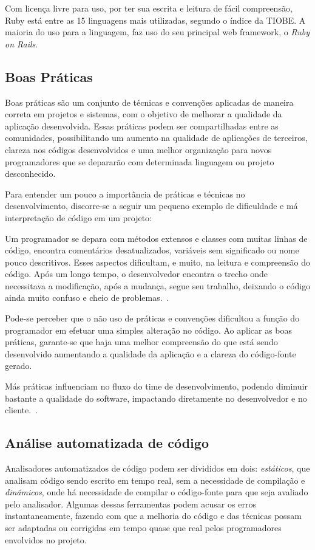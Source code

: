 \documentclass[11pt,a4paper,usenames,dvipsnames]{article}
\begin{document}
Com licença livre para uso, por ter sua escrita e leitura de fácil compreensão, Ruby está entre as 15 linguagens mais utilizadas, segundo o índice da TIOBE\cite{TIOBE}. A maioria do uso para a linguagem, faz uso do seu principal web framework, o \textit{Ruby on Rails}\cite{RoR}.

\subsection{Boas Práticas}


Boas práticas são um conjunto de técnicas e convenções aplicadas de maneira correta em projetos e sistemas, com o objetivo de melhorar a qualidade da aplicação desenvolvida. Essas práticas podem ser compartilhadas entre as comunidades, possibilitando um aumento na qualidade de aplicações de terceiros, clareza nos códigos desenvolvidos e uma melhor organização para novos programadores que se depararão com determinada linguagem ou projeto desconhecido.

Para entender um pouco a importância de práticas e técnicas no desenvolvimento, discorre-se a seguir um pequeno exemplo de dificuldade e má interpretação de código em um projeto:

Um programador se depara com métodos extensos e classes com muitas linhas de código, encontra comentários desatualizados, variáveis sem significado ou nome pouco descritivos. Esses aspectos dificultam, e muito, na leitura e compreensão do código. Após um longo tempo, o desenvolvedor encontra o trecho onde necessitava a modificação, após  a mudança, segue seu trabalho, deixando o código ainda muito confuso e cheio de problemas.~\cite{almeida2010codigo}.

Pode-se perceber que o não uso de práticas e convenções dificultou a função do programador em efetuar uma simples alteração no código. Ao aplicar as boas práticas, garante-se que haja uma melhor compreensão do que está sendo desenvolvido aumentando a qualidade da aplicação e a clareza do código-fonte gerado.

Más práticas influenciam no fluxo do time de desenvolvimento, podendo diminuir bastante a qualidade do software, impactando diretamente no desenvolvedor e no cliente.~\cite{assisimpacto}.

\subsection{Análise automatizada de código}

Analisadores automatizados de código podem ser divididos em dois: \textit{estáticos}, que analisam  código sendo escrito em tempo real, sem a necessidade de compilação e \textit{dinâmicos}, onde há necessidade de compilar o código-fonte para que seja avaliado pelo analisador. Algumas dessas ferramentas podem acusar os erros instantaneamente, fazendo com que a melhoria do código e das técnicas possam ser adaptadas ou corrigidas em tempo quase que real pelos programadores envolvidos no projeto. 
\end{document}
